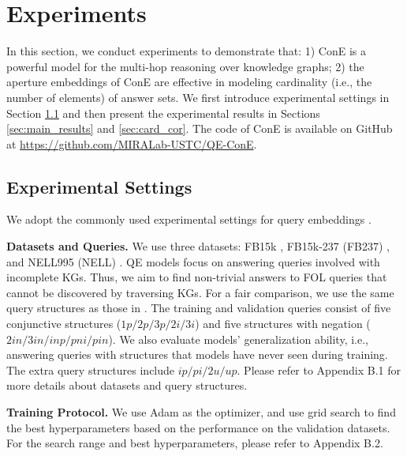 \documentclass{article}
\begin{document}
\vspace{-1mm}
\section{Experiments}
\vspace{-2mm}
In this section, we conduct experiments to demonstrate that: 1) ConE is a powerful model for the multi-hop reasoning over knowledge graphs; 2) the aperture embeddings of ConE are effective in modeling cardinality (i.e., the number of elements) of answer sets. We first introduce experimental settings in Section \ref{sec:exp_settings} and then present the experimental results in Sections \ref{sec:main_results} and \ref{sec:card_cor}. The code of ConE is available on GitHub at \url{https://github.com/MIRALab-USTC/QE-ConE}.
\vspace{-2mm}

\subsection{Experimental Settings}\label{sec:exp_settings}
\vspace{-1mm}
We adopt the commonly used experimental settings for query embeddings \cite{gqe,q2b,beta}. 

\textbf{Datasets and Queries.} We use three datasets: FB15k \cite{freebase}, FB15k-237 (FB237) \cite{fb237}, and NELL995 (NELL) \cite{deeppath}. 
QE models focus on answering queries involved with incomplete KGs. Thus, we aim to find non-trivial answers to FOL queries that cannot be discovered by traversing KGs. 
For a fair comparison, we use the same query structures as those in \citet{beta}. The training and validation queries consist of five conjunctive structures ($1p/2p/3p/2i/3i$) and five structures with negation ($2in/3in/inp/pni/pin$). We also evaluate models' generalization ability, i.e., answering queries with structures that models have never seen during training. The extra query structures include $ip/pi/2u/up$. Please refer to Appendix B.1 for more details about datasets and query structures.

\textbf{Training Protocol.} 
We use Adam \cite{adam} as the optimizer, and use grid search to find the best hyperparameters based on the performance on the validation datasets. For the search range and best hyperparameters, please refer to Appendix B.2.
\end{document}
